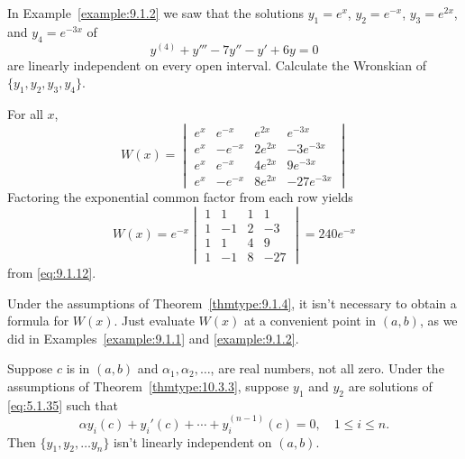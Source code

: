 \documentclass{ximera}
\begin{document}
\begin{example}\label{example:9.1.4} In
Example~\ref{example:9.1.2} we saw that the solutions $y_1=e^x$,
$y_2=e^{-x}$,
$y_3=e^{2x}$, and $y_4=e^{-3x}$ of
$$
y^{(4)}+y'''-7y''-y'+6y=0
$$
are linearly independent on every open interval.
Calculate the Wronskian  of $\{y_1,y_2,y_3,y_4\}$.

\begin{explanation}
For all $x$,
$$
W(x)=\begin{vmatrix}
e^x&e^{-x}&e^{2x}&e^{-3x}\\
e^x&-e^{-x}&2e^{2x}&-3e^{-3x}\\
e^x&e^{-x}&4e^{2x}&9e^{-3x}\\
e^x&-e^{-x}&8e^{2x}&-27e^{-3x}
\end{vmatrix}
$$
Factoring the exponential common factor from each row yields
$$
W(x)=e^{-x}\begin{vmatrix}1&1&1&1\\1&-1&2&-3\\1&1&4&9\\
1&-1&8&-27\end{vmatrix}=240e^{-x}
$$
from \eqref{eq:9.1.12}.
\end{explanation}
\end{example}

\begin{remark}
Under the assumptions of Theorem~\ref{thmtype:9.1.4}, it isn't
necessary to obtain a formula for $W(x)$. Just evaluate $W(x)$
at a convenient point in $(a,b)$, as we did in
Examples~\ref{example:9.1.1} and \ref{example:9.1.2}.
\end{remark}



\begin{theorem}\label{thmtype:9.1.5}
Suppose $c$ is in $(a,b)$ and $\alpha_{1}, \alpha_{2}, \dots$,
are real numbers, not all zero.
Under the assumptions of Theorem~\ref{thmtype:10.3.3}, suppose
$y_{1}$ and $y_{2}$ are  solutions  of \eqref{eq:5.1.35}   such that
\begin{equation} \label{eq:9.1.16}
\alpha y_{i}(c)+ y_{i}'(c)+\cdots +y_{i}^{(n-1)}(c)=0,\quad 1\leq i\leq n.
\end{equation}
Then $\{y_{1},y_{2},\dots y_{n}\}$ isn't  linearly independent on $(a,b).$
\end{theorem}
\end{document}
